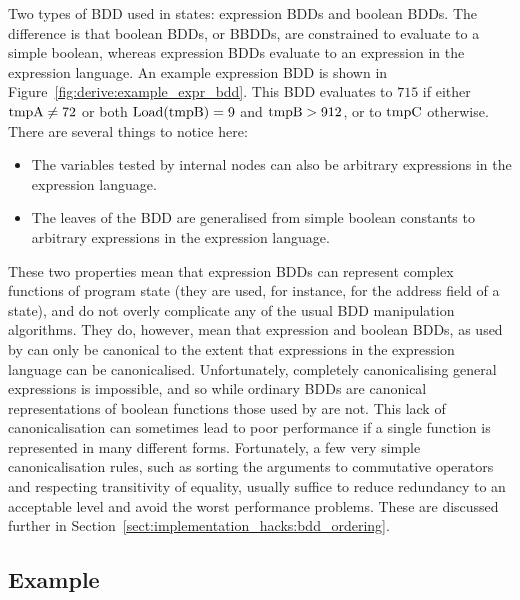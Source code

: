 Two types of BDD used in {\StateMachine} states: expression BDDs and
boolean BDDs.  The difference is that boolean BDDs, or BBDDs, are
constrained to evaluate to a simple boolean, whereas expression BDDs
evaluate to an expression in the expression language.  An example
expression BDD is shown in Figure~\ref{fig:derive:example_expr_bdd}.
This BDD evaluates to $715$ if either $\mathrm{tmpA} \not= 72$ or both
$\mathrm{Load}(\mathrm{tmpB}) = 9$ and $\mathrm{tmpB} > 912$, or to $\mathrm{tmpC}$
otherwise.  There are several things to notice here:

\begin{itemize}
\item The variables tested by internal nodes can also be arbitrary
  expressions in the expression language.
\item The leaves of the BDD are generalised from simple boolean
  constants to arbitrary expressions in the expression language.
\end{itemize}

These two properties mean that expression BDDs can represent complex
functions of program state (they are used, for instance, for the
address field of a  state), and do not overly complicate
any of the usual BDD manipulation algorithms.  They do, however, mean
that expression and boolean BDDs, as used by {\technique} can only be
canonical to the extent that expressions in the expression language
can be canonicalised.  Unfortunately, completely canonicalising
general expressions is impossible, and so while ordinary BDDs are canonical representations
of boolean functions those used by {\technique} are not.  This lack of
canonicalisation can sometimes lead to poor performance if a single
function is represented in many different forms.  Fortunately, a few
very simple canonicalisation rules, such as sorting the arguments to
commutative operators and respecting transitivity of equality, usually
suffice to reduce redundancy to an acceptable level and avoid the
worst performance problems.  These are discussed further in
Section~\ref{sect:implementation_hacks:bdd_ordering}.

\subsection{Example}
\label{sect:derive:simple_toctou_example}

